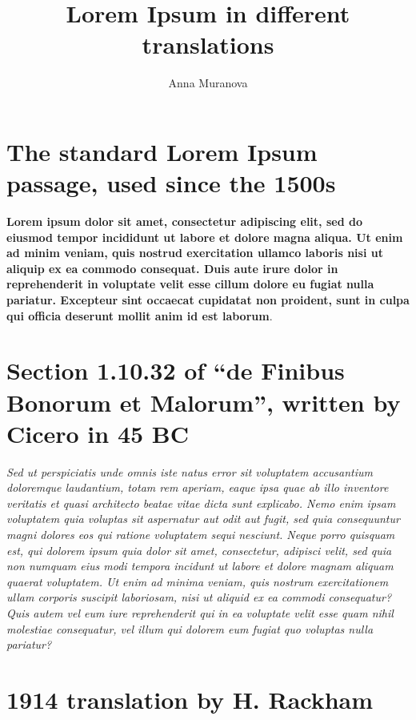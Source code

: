 \documentclass[a4paper, titlepage, 12pt]{amsart}
\author[A. Muranova]{Anna Muranova}
\title[Lorem Ipsum]{Lorem Ipsum in different translations}
\begin{document}
\maketitle



\section{The standard Lorem Ipsum passage, used since the 1500s}

\textbf{Lorem ipsum dolor sit amet, consectetur adipiscing elit, sed do eiusmod tempor incididunt ut labore et dolore magna aliqua. Ut enim ad minim veniam, quis nostrud exercitation ullamco laboris nisi ut aliquip ex ea commodo consequat. Duis aute irure dolor in reprehenderit in voluptate velit esse cillum dolore eu fugiat nulla pariatur. Excepteur sint occaecat cupidatat non proident, sunt in culpa qui officia deserunt mollit anim id est laborum}.

\section{Section 1.10.32 of ``de Finibus Bonorum et Malorum'', written by Cicero in 45 BC}

\textit{Sed ut perspiciatis unde omnis iste natus error sit voluptatem accusantium doloremque laudantium, totam rem aperiam, eaque ipsa quae ab illo inventore veritatis et quasi architecto beatae vitae dicta sunt explicabo. Nemo enim ipsam voluptatem quia voluptas sit aspernatur aut odit aut fugit, sed quia consequuntur magni dolores eos qui ratione voluptatem sequi nesciunt. Neque porro quisquam est, qui dolorem ipsum quia dolor sit amet, consectetur, adipisci velit, sed quia non numquam eius modi tempora incidunt ut labore et dolore magnam aliquam quaerat voluptatem. Ut enim ad minima veniam, quis nostrum exercitationem ullam corporis suscipit laboriosam, nisi ut aliquid ex ea commodi consequatur? Quis autem vel eum iure reprehenderit qui in ea voluptate velit esse quam nihil molestiae consequatur, vel illum qui dolorem eum fugiat quo voluptas nulla pariatur?}

\section{1914 translation by H. Rackham}
\end{document}
